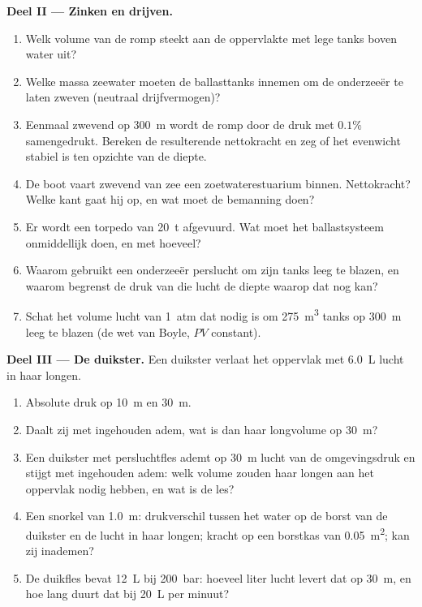 \begin{problem}
\medskip
\noindent\textbf{Deel II --- Zinken en drijven.}
\begin{enumerate}[resume]
  \item Welk volume van de romp steekt aan de oppervlakte met lege tanks boven water uit?
  \item Welke massa zeewater moeten de ballasttanks innemen om de
        onderzeeër te laten zweven (neutraal drijfvermogen)?
  \item Eenmaal zwevend op \qty{300}{m} wordt de romp door de druk met
        $0.1\%$ samengedrukt. Bereken de resulterende nettokracht en zeg
        of het evenwicht stabiel is ten opzichte van de diepte.
  \item De boot vaart zwevend van zee een zoetwaterestuarium
        binnen. Nettokracht? Welke kant gaat hij op, en wat moet de bemanning
        doen?
  \item Er wordt een torpedo van \qty{20}{t} afgevuurd. Wat moet het ballastsysteem
        onmiddellijk doen, en met hoeveel?
  \item Waarom gebruikt een onderzeeër perslucht om zijn tanks leeg te blazen, en
        waarom begrenst de druk van die lucht de diepte waarop dat nog kan?
  \item Schat het volume lucht van \qty{1}{atm} dat nodig is om
        \qty{275}{m^3} tanks op \qty{300}{m} leeg te blazen (de wet van Boyle, $PV$
        constant).
\end{enumerate}

\medskip
\noindent\textbf{Deel III --- De duikster.}
Een duikster verlaat het oppervlak met \qty{6.0}{L} lucht in haar longen.
\begin{enumerate}[resume]
  \item Absolute druk op \qty{10}{m} en \qty{30}{m}.
  \item Daalt zij met ingehouden adem, wat is dan haar longvolume op
        \qty{30}{m}?
  \item Een duikster met persluchtfles ademt op \qty{30}{m} lucht van de
        omgevingsdruk en stijgt met ingehouden adem: welk volume zouden haar
        longen aan het oppervlak nodig hebben, en wat is de les?
  \item Een snorkel van \qty{1.0}{m}: drukverschil tussen het
        water op de borst van de duikster en de lucht in haar longen; kracht op een
        borstkas van \qty{0.05}{m^2}; kan zij inademen?
  \item De duikfles bevat \qty{12}{L} bij \qty{200}{bar}: hoeveel liter
        lucht levert dat op \qty{30}{m}, en hoe lang duurt dat bij
        \qty{20}{L} per minuut?
\end{enumerate}


\end{problem}

